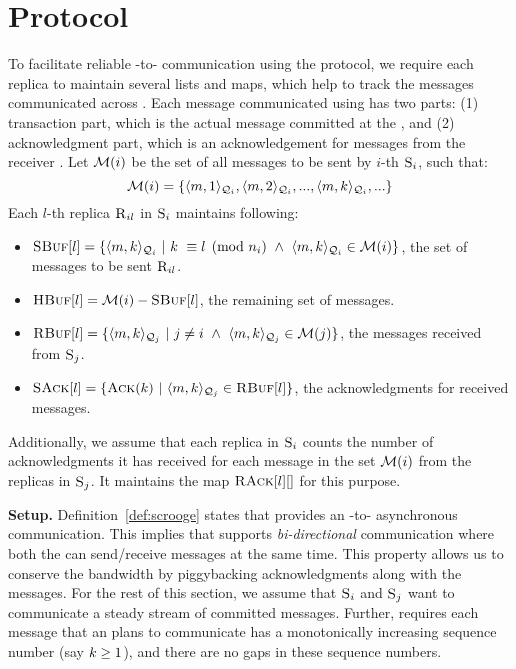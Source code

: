 \section{\Shadow{} Protocol}
To facilitate reliable \RSM{}-to-\RSM{} communication using the \Scrooge{} protocol, 
we require each replica to maintain several lists and maps, which
help to track the messages communicated across .
Each message communicated using \Scrooge{} has two parts: 
(1) transaction part, which is the actual message committed at the \RSM{}, and 
(2) acknowledgment part, which is an acknowledgement for messages from the receiver \RSM{}. 
Let $\mathcal{M}(i)$ be the set of all messages to be sent by $i$-th \RSM{} $\textsc{S}_{i}$, such that:
\begin{equation*}
\mathcal{M}(i) = \{\langle m, 1\rangle_{\mathcal{Q}_{i}},  \langle m, 2\rangle_{\mathcal{Q}_{i}}, ... , \langle m, k\rangle_{\mathcal{Q}_{i}}, ... \} 
\end{equation*}
Each $l$-th replica $\textsc{R}_{{i}{l}}$ in \RSM{} $\textsc{S}_{i}$ maintains following:

\begin{itemize}[wide]
\item $\textsc{SBuf}[{l}] = \{\langle m, k\rangle_{\mathcal{Q}_{i}} ~|~ k ~\equiv l \pmod{n_i} ~\wedge ~\langle m, k\rangle_{\mathcal{Q}_{i}} \in \mathcal{M}(i) \}$, the set of messages to be sent $\textsc{R}_{{i}{l}}$.

\item $\textsc{HBuf}[{l}] = \mathcal{M}(i) - \textsc{SBuf}[{l}]$, the remaining set of messages.

\item $\textsc{RBuf}[{l}] = \{\langle m, k\rangle_{\mathcal{Q}_{j}} ~|~ j \neq i ~\wedge ~\langle m, k\rangle_{\mathcal{Q}_{j}} \in \mathcal{M}(j) \}$, the messages received from \RSM{} $\textsc{S}_{j}$.

\item $\textsc{SAck}[{l}] = \{\textsc{Ack}(k) ~|~ \langle m, k\rangle_{\mathcal{Q}_{j}} \in \textsc{RBuf}[{l}] \}$, the acknowledgments for received messages.

\end{itemize}
%
Additionally, we assume that each replica in \RSM{} $\textsc{S}_{i}$ 
counts the number of acknowledgments it has received for 
each message in the set $\mathcal{M}(i)$ from the replicas in \RSM{} $\textsc{S}_{j}$.
It maintains the map $\textsc{RAck}[{l}][{}]$ for this purpose. 


{\bf Setup.}
Definition~\ref{def:scrooge} states that \Scrooge{} provides an \RSM{}-to-\RSM{} asynchronous communication.
This implies that \Scrooge{} supports {\em bi-directional} communication where both the  can send/receive 
messages at the same time.
This property allows us to conserve the bandwidth by piggybacking acknowledgments along with the messages.
For the rest of this section, we assume that  $\textsc{S}_{i}$ and $\textsc{S}_{j}$ want to communicate a 
steady stream of committed messages.
Further, \Scrooge{} requires each message that an \RSM{} plans to communicate has 
a monotonically increasing sequence number (say $k \ge 1$), and there are no gaps in these sequence numbers.


